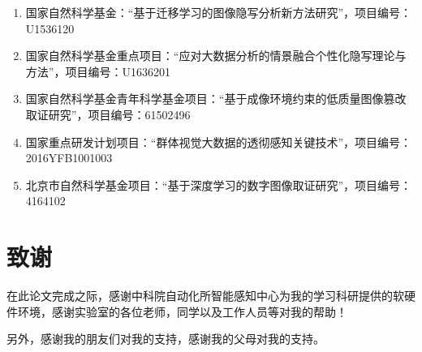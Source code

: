 \begin{enumerate}
	\item 国家自然科学基金：“基于迁移学习的图像隐写分析新方法研究”，项目编号：U1536120

	\item 国家自然科学基金重点项目：“应对大数据分析的情景融合个性化隐写理论与方法”，项目编号：U1636201

	\item 国家自然科学基金青年科学基金项目：“基于成像环境约束的低质量图像篡改取证研究”，项目编号：61502496

	\item 国家重点研发计划项目：“群体视觉大数据的透彻感知关键技术”，项目编号：2016YFB1001003

	\item 北京市自然科学基金项目：“基于深度学习的数字图像取证研究”，项目编号：4164102

\end{enumerate}

\chapter{致\quad 谢}
在此论文完成之际，感谢中科院自动化所智能感知中心为我的学习科研提供的软硬件环境，感谢实验室的各位老师，同学以及工作人员等对我的帮助！

另外，感谢我的朋友们对我的支持，感谢我的父母对我的支持。

